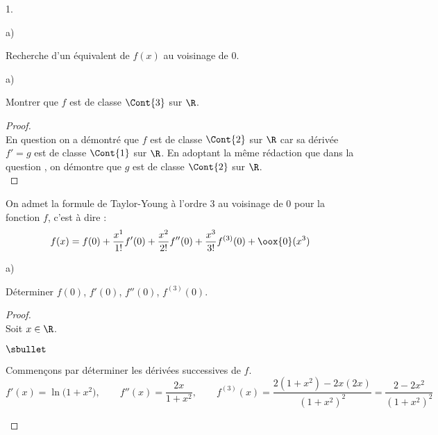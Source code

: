 \begin{noliste}{1.}
\begin{noliste}{a)}
  \end{noliste}

\item Recherche d'un équivalent de $f(x)$ au voisinage de $0$.
  \begin{noliste}{a)}
    \setlength{\itemsep}{2mm}
  \item Montrer que $f$ est de classe $\Cont{3}$ sur $\R$.

    \begin{proof}~\\%
      En question  on a démontré que $f$ est de classe
      $\Cont{2}$ sur $\R$ car sa dérivée $f' = g$ est de classe
      $\Cont{1}$ sur $\R$. En adoptant la même rédaction que dans la
      question , on démontre que $g$ est de classe
      $\Cont{2}$ sur $\R$.%
      ~\\[-1.2cm] 
    \end{proof}
  \end{noliste}
  On admet la formule de Taylor-Young à l'ordre $3$ au voisinage de
  $0$ pour la fonction $f$, c'est à dire :
  \[
  f(x) = f(0) + \dfrac{x^1}{1!} f'(0) + \dfrac{x^2}{2!} f''(0) +
  \dfrac{x^3}{3!} f^{(3)}(0) + \oox{0} (x^3)
  \]
  \begin{noliste}{a)}
    \setcounter{enumii}{1} %
    \setlength{\itemsep}{2mm}
  \item Déterminer $f(0)$, $f'(0)$, $f''(0)$, $f^{(3)}(0)$.

    \begin{proof}~\\%
      Soit $x \in \R$.
      \begin{noliste}{$\sbullet$}
      \item Commençons par déterminer les dérivées successives de $f$.
        \[
        f'(x) = \ln\big( 1+x^2 \big), \qquad f''(x) =
        \dfrac{2x}{1+x^2}, \qquad f^{(3)}(x) = \dfrac{2(1+x^2) -
          2x(2x)}{(1+x^2)^2} = \dfrac{2 - 2x^2}{(1+x^2)^2}
        \]


\end{noliste}
\end{proof}
\end{noliste}
\end{noliste}
